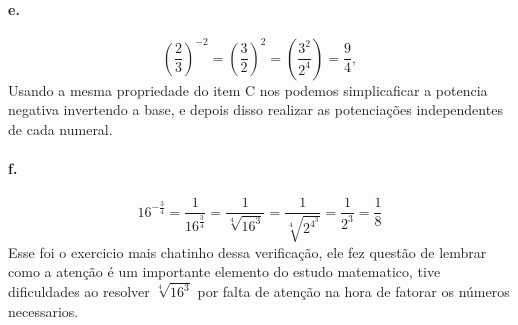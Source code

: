 	\paragraph{e.}
	\begin{equation}
	\left(\frac{2}{3}\right)^{-2} = \left(\frac{3}{2}\right)^{2} = \left(\frac{3^2}{2^4}\right) = \frac{9}{4},
	\end{equation}
	Usando a mesma propriedade do item C nos podemos simplicaficar a potencia negativa invertendo a base, e depois disso realizar as potenciações independentes de cada numeral.

	\paragraph{f.}
	\begin{equation}
	16^{-\frac{3}{4}} = \frac{1}{16^{\frac{3}{4}}} = \frac{1}{\sqrt[4]{16^3}} = \frac{1}{\sqrt[4]{2^{4^{3}}}} = \frac{1}{2^3} = \frac{1}{8} 
	\end{equation}
	Esse foi o exercicio mais chatinho dessa verificação, ele fez questão de lembrar como a atenção é um importante elemento do estudo matematico, tive dificuldades ao resolver $\sqrt[4]{16^3}$ por falta de atenção na hora de fatorar os números necessarios.






